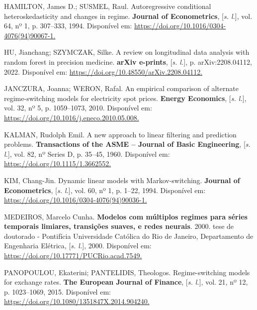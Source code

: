 \documentclass[
  letterpaper,
  DIV=11,
  numbers=noendperiod]{scrartcl}
\newlength{\cslhangindent}
\newenvironment{CSLReferences}[2] %
 {\begin{list}{}{%
  \setlength{\itemindent}{0pt}
  \setlength{\leftmargin}{0pt}
  \setlength{\parsep}{0pt}
  \ifodd #1
   \setlength{\leftmargin}{\cslhangindent}
   \setlength{\itemindent}{-1\cslhangindent}
  \fi
  \setlength{\itemsep}{#2\baselineskip}}}
 {\end{list}}
\numberwithin{equation}{section}
\numberwithin{table}{section}
\numberwithin{figure}{section}
\begin{document}
\begin{CSLReferences}{0}{1}
HAMILTON, James D.; SUSMEL, Raul. Autoregressive conditional
heteroskedasticity and changes in regime. \textbf{Journal of
Econometrics}, {[}\emph{s. l.}{]}, vol. 64, nº 1, p. 307--333, 1994.
Disponível em:
\href{https://doi.org/10.1016/0304-4076(94)90067-1}{https://doi.org/10.1016/0304-4076(94)90067-1.
}

HU, Jianchang; SZYMCZAK, Silke. A review on longitudinal data analysis
with random forest in precision medicine. \textbf{arXiv e-prints},
{[}\emph{s. l.}{]}, p. arXiv:2208.04112, 2022. Disponível em:
\href{https://doi.org/10.48550/arXiv.2208.04112}{https://doi.org/10.48550/arXiv.2208.04112.
}

JANCZURA, Joanna; WERON, Rafal. An empirical comparison of alternate
regime-switching models for electricity spot prices. \textbf{Energy
Economics}, {[}\emph{s. l.}{]}, vol. 32, nº 5, p. 1059--1073, 2010.
Disponível em:
\href{https://doi.org/10.1016/j.eneco.2010.05.008}{https://doi.org/10.1016/j.eneco.2010.05.008.
}

KALMAN, Rudolph Emil. A new approach to linear filtering and prediction
problems. \textbf{Transactions of the ASME -- Journal of Basic
Engineering}, {[}\emph{s. l.}{]}, vol. 82, nº Series D, p. 35--45, 1960.
Disponível em:
\href{https://doi.org/10.1115/1.3662552}{https://doi.org/10.1115/1.3662552.
}

KIM, Chang-Jin. Dynamic linear models with Markov-switching.
\textbf{Journal of Econometrics}, {[}\emph{s. l.}{]}, vol. 60, nº 1, p.
1--22, 1994. Disponível em:
\href{https://doi.org/10.1016/0304-4076(94)90036-1}{https://doi.org/10.1016/0304-4076(94)90036-1.
}

MEDEIROS, Marcelo Cunha. \textbf{Modelos com múltiplos regimes para
séries temporais limiares, transições suaves, e redes neurais}. 2000.
tese de doutorado - Pontifícia Universidade Católica do Rio de Janeiro,
Departamento de Engenharia Elétrica, {[}\emph{s. l.}{]}, 2000.
Disponível em:
\href{https://doi.org/10.17771/PUCRio.acad.7549}{https://doi.org/10.17771/PUCRio.acad.7549.
}

PANOPOULOU, Ekaterini; PANTELIDIS, Theologos. Regime-switching models
for exchange rates. \textbf{The European Journal of Finance},
{[}\emph{s. l.}{]}, vol. 21, nº 12, p. 1023--1069, 2015. Disponível em:
\href{https://doi.org/10.1080/1351847X.2014.904240}{https://doi.org/10.1080/1351847X.2014.904240.
}


\end{CSLReferences}
\end{document}
